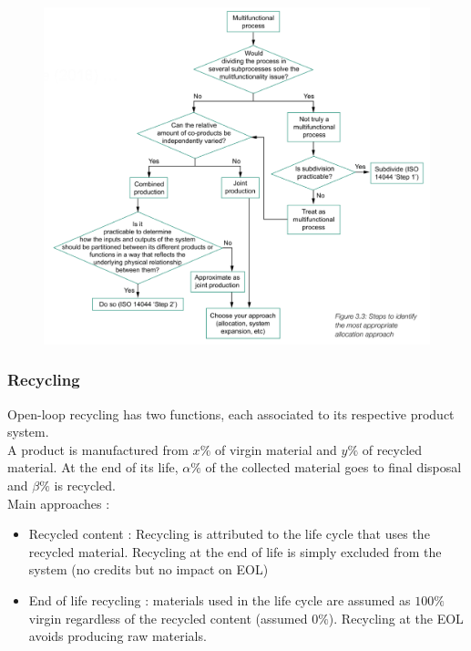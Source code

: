 \documentclass[../main.tex]{subfiles}
\begin{document}
\begin{figure}[hbt!]
    \centering
    \includegraphics[width=0.8\linewidth]{IMAGES/LCA/Screenshot 2024-10-29 at 16.59.24.jpeg.png}
\end{figure}

\subsubsection{Recycling}
Open-loop recycling has two functions, each associated to its respective product system.\\
A product is manufactured from $x\%$ of virgin material and $y \%$ of recycled material. At the end of its life, $\alpha \%$ of the collected material goes to final disposal and $\beta \%$ is recycled.\\
Main approaches : \begin{itemize}
    \item Recycled content : Recycling is attributed to the life cycle that uses the recycled material. Recycling at the end of life is simply excluded from the system (no credits but no impact on EOL)
    \item End of life recycling : materials used in the life cycle are assumed as $100\%$ virgin regardless of the recycled content (assumed $0\%$). Recycling at the EOL avoids producing raw materials.
\end{itemize}
\end{document}
